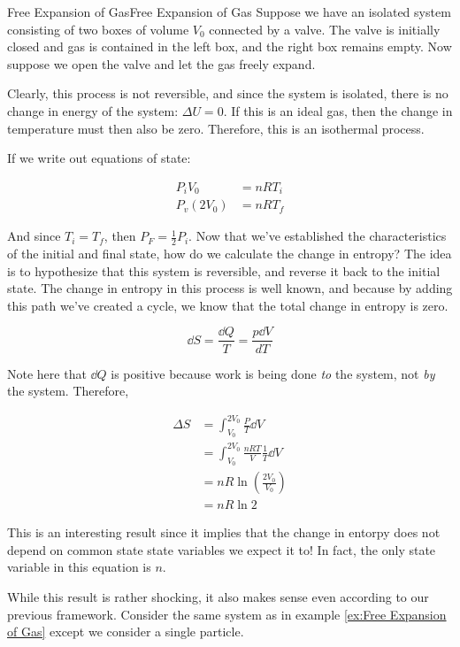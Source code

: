 \begin{example}{Free Expansion of Gas}{Free Expansion of Gas}
    Suppose we have an isolated system consisting of two boxes of volume $V_0$ connected by a valve. The valve is initially closed and gas is contained in the left box, and the right box remains empty. Now suppose we open the valve and let the gas freely expand. 

    Clearly, this process is not reversible, and since the system is isolated, there is no change in energy of the system: $\Delta U = 0$. If this is an ideal gas, then the change in temperature must then also be zero. Therefore, this is an isothermal process. 

    If we write out equations of state:

    \begin{align*}
        P_iV_0 &= nRT_i\\
        P_v(2V_0) &= nRT_f
    \end{align*}

    And since $T_i = T_f$, then $P_F = \frac{1}{2} P_i$. Now that we've established the characteristics of the initial and final state, how do we calculate the change in entropy? The idea is to hypothesize that this system is reversible, and reverse it back to the initial state. The change in entropy in this process is well known, and because by adding this path we've created a cycle, we know that the total change in entropy is zero. 

    \[ \dd S = \frac{\dd Q}{T} = \frac{p \dd V}{dT}\]

    Note here that $\dd Q$ is positive because work is being done \textit{to} the system, not \textit{by} the system. Therefore, 

    \begin{align*}
        \Delta S &= \int_{V_0}^{2V_0} \frac PT \dd V\\
        &= \int_{V_0}^{2V_0} \frac{nRT}{V} \frac{1}{T} \dd V\\
        &= nR \ln \left(\frac{2V_0}{V_0}\right)\\
        &= nR \ln 2
    \end{align*}

    This is an interesting result since it implies that the change in entorpy does not depend on common state state variables we expect it to! In fact, the only state variable in this equation is $n$.
    
\end{example}

While this result is rather shocking, it also makes sense even according to our previous framework. Consider the same system as in example \ref{ex:Free Expansion of Gas} except we consider a single particle. 


